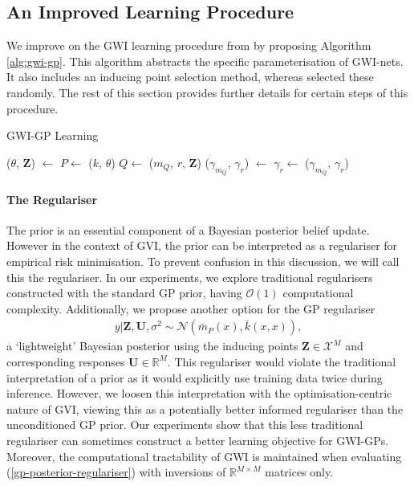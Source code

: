 \documentclass{article}
\numberwithin{equation}{section}
\begin{document}
\subsection{An Improved Learning Procedure}
We improve on the GWI learning procedure from \cite{wild2022generalized} by proposing Algorithm \ref{alg:gwi-gp}.
This algorithm abstracts the specific parameterisation of GWI-nets. 
It also includes an inducing point selection method, whereas \cite{wild2022generalized} selected these randomly.
The rest of this section provides further details for certain steps of this procedure.
\begin{algorithm}[h!]
\caption{GWI-GP Learning}\label{alg:gwi-gp}
\begin{algorithmic}
     
    \State ($\theta$, $\mathbf{Z}$) $\leftarrow$  
    \State $P \leftarrow$ ($k$, $\theta$) 
    \State $Q \leftarrow$ ($m_Q$, $r$, $\mathbf{Z}$) 
    \State ($\gamma_{m_Q}$, $\gamma_r$) $\leftarrow$  
    \State $\gamma_r \leftarrow$  
    \State \Return ($\gamma_{m_Q}$, $\gamma_r$)
\end{algorithmic}
\end{algorithm}
\paragraph{The Regulariser} The prior is an essential component of a Bayesian posterior belief update.
However in the context of GVI, the prior can be interpreted as a regulariser for empirical risk minimisation.
To prevent confusion in this discussion, we will call this the regulariser. 
In our experiments, we explore traditional regularisers constructed with the standard GP prior, having $\mathcal{O}(1)$ computational complexity. 
Additionally, we propose another option for the GP regulariser
\begin{align}
    y \vert \mathbf{Z}, \mathbf{U}, \sigma^2
    \sim \mathcal{N}\left(\bar{m}_P(x), \bar{k}(x, x)\right),
    \label{gp-posterior-regulariser}
\end{align}
a `lightweight' Bayesian posterior using the inducing points $\mathbf{Z}\in \mathcal{X}^M$ and corresponding responses $\mathbf{U} \in \mathbb{R}^M$.
This regulariser would violate the traditional interpretation of a prior as it would explicitly use training data twice during inference.
However, we loosen this interpretation with the optimisation-centric nature of GVI, viewing this as a potentially better informed regulariser than the unconditioned GP prior.
Our experiments show that this less traditional regulariser can sometimes construct a better learning objective for GWI-GPs.
Moreover, the computational tractability of GWI is maintained when evaluating (\ref{gp-posterior-regulariser}) with inversions of $\mathbb{R}^{M\times M}$ matrices only.
\end{document}
